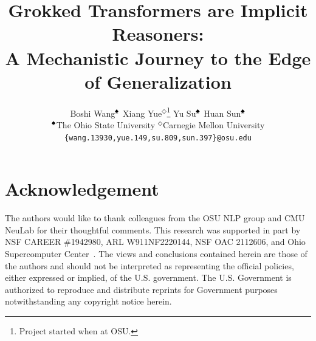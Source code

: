 \documentclass{article}
\title{Grokked Transformers are Implicit Reasoners: \\A Mechanistic Journey to the Edge of Generalization}
\author{
    Boshi Wang$^\text{\ding{171}}$ \hspace{1.3em}
    Xiang Yue$^\Diamond$\thanks{Project started when at OSU.} \hspace{1.3em}
    Yu Su$^\text{\ding{171}}$ \hspace{1.3em}
    Huan Sun$^\text{\ding{171}}$ \hspace{1.3em} \\
    $^\text{\ding{171}}$The Ohio State University \qquad
    $^\Diamond$Carnegie Mellon University \qquad \\
    \texttt{\{wang.13930,yue.149,su.809,sun.397\}@osu.edu}
}
\begin{document}
\maketitle















\section*{Acknowledgement}
The authors would like to thank colleagues from the OSU NLP group and CMU NeuLab for their thoughtful comments. This research was supported in part by NSF CAREER \#1942980, ARL W911NF2220144, NSF OAC 2112606, and Ohio Supercomputer Center~\citep{OhioSupercomputerCenter1987}. The views and conclusions contained herein are those of the authors and should not be interpreted as representing the official policies, either expressed or implied, of the U.S. government. The U.S. Government is authorized to reproduce and distribute reprints for Government purposes notwithstanding any copyright notice herein.


% 



\appendix

% 
\end{document}
